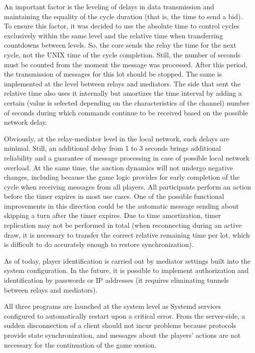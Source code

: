 \documentclass[
]{ceurart}
\begin{document}
An important factor is the leveling of delays in data transmission and maintaining the equality of the cycle duration (that is, the time to send a bid). To ensure this factor, it was decided to use the absolute time to control cycles exclusively within the same level and the relative time when transferring countdowns between levels. So, the core sends the relay the time for the next cycle, not the UNIX time of the cycle completion. Still, the number of seconds must be counted from the moment the message was processed. After this period, the transmission of messages for this lot should be stopped. The same is implemented at the level between relays and mediators. The side that sent the relative time also uses it internally but amortizes the time interval by adding a certain (value is selected depending on the characteristics of the channel) number of seconds during which commands continue to be received based on the possible network delay.

Obviously, at the relay-mediator level in the local network, such delays are minimal. Still, an additional delay from 1 to 3 seconds brings additional reliability and a guarantee of message processing in case of possible local network overload. At the same time, the auction dynamics will not undergo negative changes, including because the game logic provides for early completion of the cycle when receiving messages from all players. All participants perform an action before the timer expires in most use cases. One of the possible functional improvements in this direction could be the automatic message sending about skipping a turn after the timer expires. Due to time amortization, timer replication may not be performed in total (when reconnecting during an active draw, it is necessary to transfer the correct relative remaining time per lot, which is difficult to do accurately enough to restore synchronization).

As of today, player identification is carried out by mediator settings built into the system configuration. In the future, it is possible to implement authorization and identification by passwords or IP addresses (it requires eliminating tunnels between relays and mediators).

All three programs are launched at the system level as Systemd services configured to automatically restart upon a critical error. From the server-side, a sudden disconnection of a client should not incur problems because protocols provide state synchronization, and messages about the players’ actions are not necessary for the continuation of the game session.
\end{document}
